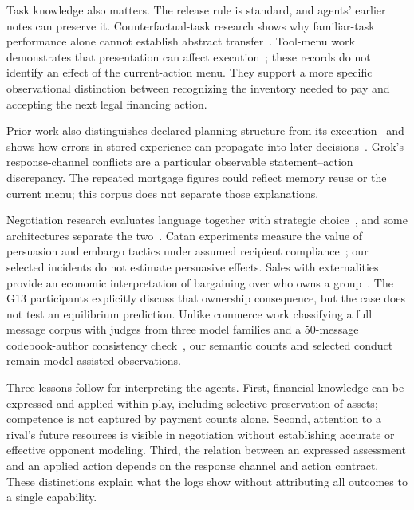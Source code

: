 Task knowledge also matters. The release rule is standard, and agents' earlier notes can preserve it. Counterfactual-task research shows why familiar-task performance alone cannot establish abstract transfer~\cite{wu2024reciting}. Tool-menu work demonstrates that presentation can affect execution~\cite{yan2026menu}; these records do not identify an effect of the current-action menu. They support a more specific observational distinction between recognizing the inventory needed to pay and accepting the next legal financing action.

Prior work also distinguishes declared planning structure from its execution~\cite{oota2026declare} and shows how errors in stored experience can propagate into later decisions~\cite{xiong2026memory}. Grok's response-channel conflicts are a particular observable statement--action discrepancy. The repeated mortgage figures could reflect memory reuse or the current menu; this corpus does not separate those explanations.

Negotiation research evaluates language together with strategic choice~\cite{lewis2017deal,bianchi2024negotiationarena}, and some architectures separate the two~\cite{he2018decoupling}. Catan experiments measure the value of persuasion and embargo tactics under assumed recipient compliance~\cite{guhe2014persuasion}; our selected incidents do not estimate persuasive effects. Sales with externalities provide an economic interpretation of bargaining over who owns a group~\cite{jehiel1996externalities}. The G13 participants explicitly discuss that ownership consequence, but the case does not test an equilibrium prediction. Unlike commerce work classifying a full message corpus with judges from three model families and a 50-message codebook-author consistency check~\cite{li2026arena}, our semantic counts and selected conduct remain model-assisted observations.

Three lessons follow for interpreting the agents. First, financial knowledge can be expressed and applied within play, including selective preservation of assets; competence is not captured by payment counts alone. Second, attention to a rival's future resources is visible in negotiation without establishing accurate or effective opponent modeling. Third, the relation between an expressed assessment and an applied action depends on the response channel and action contract. These distinctions explain what the logs show without attributing all outcomes to a single capability.

